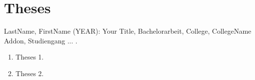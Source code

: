 \chapter*{Theses}

LastName, FirstName (YEAR): Your Title, Bachelorarbeit, College, CollegeName Addon, Studiengang ... .

\vspace{1cm}

\begin{enumerate}
	\item Theses 1.
	
	\item Theses 2.
\end{enumerate}